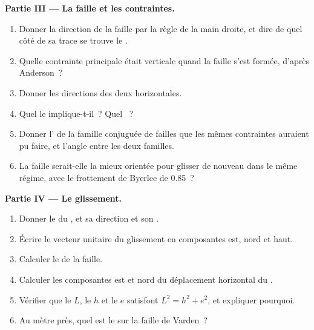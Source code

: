 \begin{problem}
\medskip
\noindent\textbf{Partie III --- La faille et les contraintes.}
\begin{enumerate}[resume]
  \item Donner la direction de la faille par la règle de la main droite, et dire de quel
        côté de sa trace se trouve le .
  \item Quelle contrainte principale était verticale quand la faille s'est formée, d'après
        Anderson~?
  \item Donner les directions des deux  horizontales.
  \item Quel  le  implique-t-il~? Quel ~?
  \item Donner l' de la famille conjuguée de failles que les mêmes
        contraintes auraient pu faire, et l'angle entre les deux familles.
  \item La faille serait-elle la mieux orientée pour glisser de nouveau dans le même régime,
        avec le frottement de Byerlee de 0.85~?
\end{enumerate}

\medskip
\noindent\textbf{Partie IV --- Le glissement.}
\begin{enumerate}[resume]
  \item Donner le  du , et sa direction et son .
  \item Écrire le vecteur unitaire du glissement en composantes est, nord et haut.
  \item Calculer le  de la faille.
  \item Calculer les composantes est et nord du déplacement horizontal
        du .
  \item Vérifier que le  $L$, le  $h$ et le  $e$ satisfont
        $L^2 = h^2 + e^2$, et expliquer pourquoi.
  \item Au mètre près, quel est le  sur la faille de Varden~?
\end{enumerate}
\end{problem}
